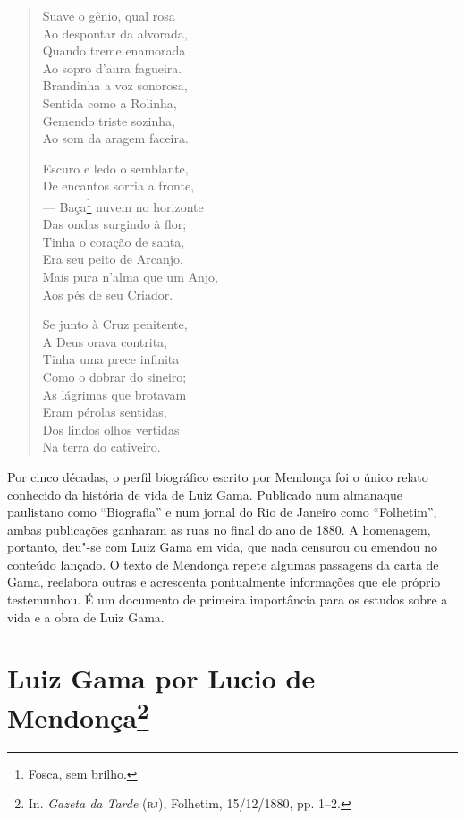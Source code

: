 \begin{verse}
Suave o gênio, qual rosa\\
Ao despontar da alvorada,\\
Quando treme enamorada\\
Ao sopro d'aura fagueira.\\
Brandinha a voz sonorosa,\\
Sentida como a Rolinha,\\
Gemendo triste sozinha,\\
Ao som da aragem faceira.

Escuro e ledo o semblante,\\
De encantos sorria a fronte,\\
--- Baça\footnote{Fosca, sem brilho.} nuvem no horizonte\\
Das ondas surgindo à flor;\\
Tinha o coração de santa,\\
Era seu peito de Arcanjo,\\
Mais pura n'alma que um Anjo,\\
Aos pés de seu Criador.

Se junto à Cruz penitente,\\
A Deus orava contrita,\\
Tinha uma prece infinita\\
Como o dobrar do sineiro;\\
As lágrimas que brotavam\\
Eram pérolas sentidas,\\
Dos lindos olhos vertidas\\
Na terra do cativeiro.
\end{verse}


\pagebreak
\mbox{}\vfill
\thispagestyle{empty}

{\small\noindent
Por cinco décadas, o perfil biográfico escrito por Mendonça foi o
único relato conhecido da história de vida de Luiz Gama. Publicado num
almanaque paulistano como ``Biografia'' e num jornal do Rio de Janeiro
como ``Folhetim'', ambas publicações ganharam as ruas no final do ano de
1880. A homenagem, portanto, deu"-se com Luiz Gama em vida, que nada
censurou ou emendou no conteúdo lançado. O texto de Mendonça repete
algumas passagens da carta de Gama, reelabora outras e acrescenta
pontualmente informações que ele próprio testemunhou. É um documento de
primeira importância para os estudos sobre a vida e a obra de Luiz Gama.
}

\chapter{Luiz Gama por Lucio de Mendonça\footnote[*]{In.
  \emph{Gazeta da Tarde} (\textsc{rj}), Folhetim, 15/12/1880, pp. 1--2.}}


